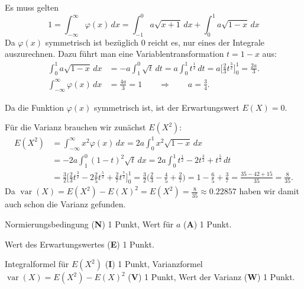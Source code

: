 \begin{loesung}
\begin{teilaufgaben}
\item
Es muss gelten
\[
1
=
\int_{-\infty}^\infty \varphi(x)\,dx
=
\int_{-1}^0 a\sqrt{x+1}\,dx
+
\int_0^1a\sqrt{1-x}\,dx
\]
Da $\varphi(x)$ symmetrisch ist bezüglich $0$ reicht es, nur eines der
Integrale auszurechnen.
Dazu führt man eine Variablentransformation $t=1-x$ aus:
\begin{align*}
\int_0^1a\sqrt{1-x}\,dx
&=
-a\int_1^0 \sqrt{t}\,dt
=
a\int_0^1 t^{\frac12}\,dt
=
a\biggl[\frac23 t^{\frac32}\biggr]_0^1
=
\frac{2a}3.
\\
\int_{-\infty}^\infty\varphi(x)\,dx
&=
\frac{4a}{3}
=
1
\qquad\Rightarrow\qquad
a=\frac{3}{4}.
\end{align*}
\item
Da die Funktion $\varphi(x)$ symmetrisch ist, ist der Erwartungswert $E(X)=0$.
\item
Für die  Varianz brauchen wir zunächst $E(X^2)$:
\begin{align*}
E(X^2)
&=
\int_{-\infty}^\infty x^2\varphi(x)\,dx
=
2a\int_0^1 x^2\sqrt{1-x}\,dx
\\
&=
-2a\int_1^0 (1-t)^2\sqrt{t}\,dx
=
2a\int_0^1 t^{\frac12}-2t^{\frac32}+t^{\frac52}\,dt
\\
&=
\frac32\biggl[
\frac23 t^{\frac32}
-2\frac25 t^{\frac52}
+\frac27t^{\frac72}
\biggr]_0^1
=
\frac32\biggl(
\frac23 - \frac45+\frac27
\biggr)
=
1-\frac65+\frac37
=
\frac{35-42+15}{35}
=
\frac{8}{35}.
\end{align*}
Da $\operatorname{var}(X)= E(X^2) - E(X)^2=E(X^2)=\frac{8}{35}\approx0.22857$ haben wir damit
auch schon die Varianz gefunden.
\qedhere
\end{teilaufgaben}
\end{loesung}

\begin{bewertung}
\begin{teilaufgaben}
\item
Normierungsbedingung ({\bf N}) 1 Punkt,
Wert für $a$ ({\bf A}) 1 Punkt.
\item
Wert des Erwartungswertes ({\bf E}) 1 Punkt.
\item
Integralformel für $E(X^2)$ ({\bf I}) 1 Punkt,
Varianzformel $\operatorname{var}(X) = E(X^2)- E(X)^2$ ({\bf V}) 1 Punkt,
Wert der Varianz ({\bf W}) 1 Punkt.
\end{teilaufgaben}
\end{bewertung}
